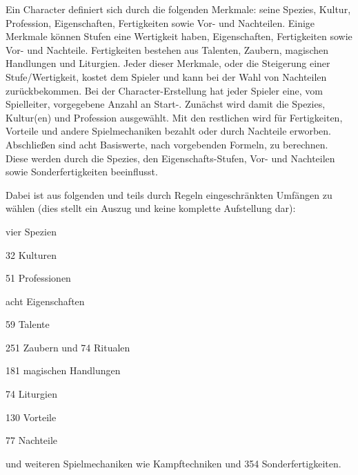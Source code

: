 Ein Character definiert sich durch die folgenden Merkmale: seine Spezies, Kultur, Profession, Eigenschaften, Fertigkeiten sowie Vor- und Nachteilen.
Einige Merkmale können Stufen \bzw eine Wertigkeit haben, \uA Eigenschaften, Fertigkeiten sowie Vor- und Nachteile.
Fertigkeiten bestehen aus Talenten, Zaubern, magischen Handlungen und Liturgien.
Jeder dieser Merkmale, oder die Steigerung einer Stufe/Wertigkeit, kostet dem Spieler  und kann bei der Wahl von Nachteilen  zurückbekommen.
Bei der Character-Erstellung hat jeder Spieler eine, vom Spielleiter, vorgegebene Anzahl an Start-.
Zunächst wird damit die Spezies, Kultur(en) und Profession ausgewählt.
Mit den restlichen  wird für Fertigkeiten, Vorteile und andere Spielmechaniken bezahlt oder durch Nachteile erworben.
Abschließen sind acht Basiswerte, nach vorgebenden Formeln, zu berechnen.
Diese werden \ggfs durch die Spezies, den Eigenschafts-Stufen, Vor- und Nachteilen sowie Sonderfertigkeiten beeinflusst.

Dabei ist aus folgenden und teils durch Regeln eingeschränkten Umfängen zu wählen (dies stellt ein Auszug und keine komplette Aufstellung dar):%
\begin{itemize*}[label={}, itemjoin={,}]%
    \item vier Spezien
    \item 32 Kulturen
    \item 51 Professionen
    \item acht Eigenschaften
    \item 59 Talente
    \item 251 Zaubern und 74 Ritualen
    \item 181 magischen Handlungen
    \item 74 Liturgien
    \item 130 Vorteile
    \item 77 Nachteile
    \item und weiteren Spielmechaniken wie  Kampftechniken und 354 Sonderfertigkeiten.
\end{itemize*}

